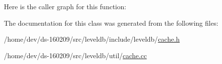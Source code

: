 Here is the caller graph for this function\+:




The documentation for this class was generated from the following files\+:\begin{DoxyCompactItemize}
\item 
/home/dev/ds-\/160209/src/leveldb/include/leveldb/\hyperlink{cache_8h}{cache.\+h}\item 
/home/dev/ds-\/160209/src/leveldb/util/\hyperlink{cache_8cc}{cache.\+cc}\end{DoxyCompactItemize}
